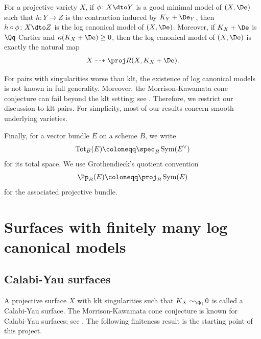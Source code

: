\documentclass[12pt]{amsart}
\newcommand{\Sym}{\operatorname{Sym}}
\newcommand{\Tot}{\operatorname{Tot}}
\begin{document}
For a projective variety $X$, if $\phi\colon X \dto Y$ is a good minimal model of $(X, \De)$ such that $h\colon Y \to Z$ is the contraction induced by $K_Y+\De_Y$, then $h\circ \phi \colon X \dto Z$ is the log canonical model of $(X,\De)$. Moreover, if $K_X+\De$ is $\Qq$-Cartier and
$\kappa(K_X+\De)\geq0$, then the log canonical model of $(X,\De)$ is
exactly the natural map
\[
X\dashrightarrow\proj R(X,K_X+\De).
\]

For pairs with singularities worse than klt, the existence of log
canonical models is not known in full generality. Moreover, the
Morrison-Kawamata cone conjecture can fail beyond the klt setting;
see \cite{Tot10}. Therefore, we restrict our discussion to klt pairs.
For simplicity, most of our results concern smooth underlying varieties.

Finally, for a vector bundle $E$ on a scheme $B$, we write
\[
\Tot_B(E)\coloneqq\spec_B\Sym(E^\vee)
\]
for its total space. We use Grothendieck's quotient convention
\[
\Pp_B(E)\coloneqq\proj_B\Sym(E)
\]
for the associated projective bundle. 

\section{Surfaces with finitely many log canonical models}\label{sec:positive}

\subsection{Calabi-Yau surfaces}

A projective surface $X$ with klt singularities such that
$K_X\sim_{\Qq}0$ is called a Calabi-Yau surface. The
Morrison-Kawamata cone conjecture is known for Calabi-Yau surfaces;
see \cite{Kaw97,Tot10}. The following finiteness result is the starting
point of this project.
\end{document}
